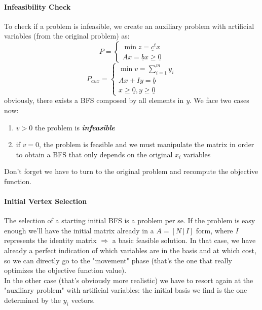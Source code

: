             \paragraph{Infeasibility Check}
            To check if a problem is infeasible, we create an auxiliary problem with artificial variables (from the original problem) as:
                \begin{equation}
                    P = 
                    \begin{cases}
                        \min z = \underline{c}^t x\\
                        Ax = \underline{b}
                        x \geq \underline{0}
                    \end{cases}
                \end{equation}
                \begin{equation}
                    P_{aux} = 
                    \begin{cases}
                        \min v = \sum_{i = 1}^m y_i\\
                        Ax + Iy= \underline{b}\\
                        x \geq \underline{0}, y \geq \underline{0}
                    \end{cases}
                \end{equation}
                obviously, there exists a BFS composed by all elements in \emph{y}. We face two cases now:
                \begin{enumerate}
                    \item $v > 0$ the problem is \textit{\textbf{infeasible}}
                    \item if $v = 0$, the problem is feasible and we must manipulate the matrix in order to obtain a BFS that only depends on the original $x_i$ variables
                \end{enumerate}
                Don't forget we have to turn to the original problem and recompute the objective function.

            \paragraph{Initial Vertex Selection}
                The selection of a starting initial BFS is a problem per se. If the problem is easy enough we'll have the initial matrix already in a $A = [N \,\vert\, I]$ form, where \emph{I} represents the identity matrix $\Rightarrow$ a basic feasible solution. In that case, we have already a perfect indication of which variables are in the basis and at which cost, so we can directly go to the "movement" phase (that's the one that really optimizes the objective function value).\\
                In the other case (that's obviously more realistic) we have to resort again at the "auxiliary problem" with artificial variables: the initial basis we find is the one determined by the $y_i$ vectors.


